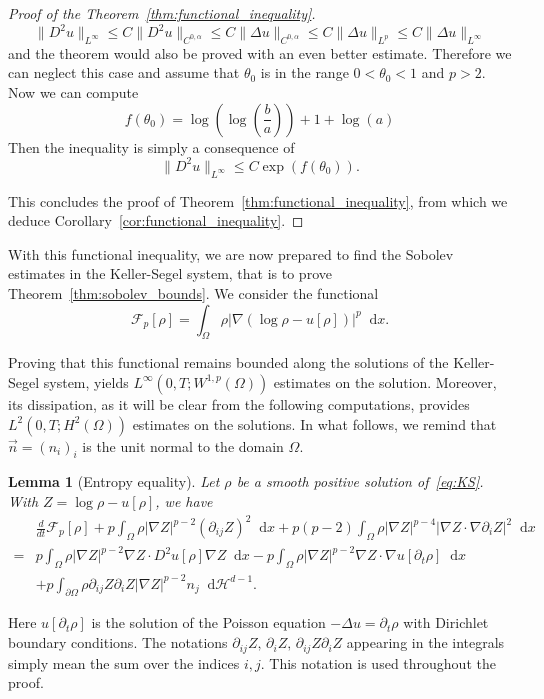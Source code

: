 \documentclass[a4paper,twosided, 11pt]{article}
\renewcommand{\color}[2][]{}
\newcommand {\f}   {\frac}
\newcommand {\p}   {\partial}
\theoremstyle{plain}
\newtheorem{lemma}[thm]{Lemma}
\theoremstyle{remark}
\newcommand{\diff}{\mathop{}\!\mathrm{d}}
\numberwithin{equation}{section}
\begin{document}
\begin{proof}[Proof of the Theorem~\ref{thm:functional_inequality}]
$$
\|D^{2} u\|_{L^{\infty}}\le C\|D^{2} u\|_{C^{0,\alpha}} \le C \|\Delta u\|_{C^{0,\alpha}}\le C \|\Delta u\|_{L^{p}} \le C \|\Delta u\|_{L^{\infty}}
$$
and the theorem would also be proved with an even better estimate. Therefore we can neglect this case and assume that $\theta_{0}$ is in the range $0<\theta_{0}<1$ and $p> 2$. 
Now we can compute
$$
f(\theta_{0}) = \log\left(\log\left(\f{b}{a}\right)\right)+1 + \log(a)
$$
Then the inequality is simply a consequence of 
$$
\|D^{2}u\|_{L^{\infty}}\le C\exp(f(\theta_{0})).
$$

This concludes the proof of Theorem~\ref{thm:functional_inequality}, from which we deduce Corollary~\ref{cor:functional_inequality}.
\end{proof}


With this functional inequality, we are now prepared to find the Sobolev estimates in the Keller-Segel system, that is to prove Theorem~\ref{thm:sobolev_bounds}. We consider the functional
$$
\mathcal{F}_{p}[\rho]= \int_{\Omega}\rho \left|\nabla (\log \rho - u[\rho])\right|^p\diff x.
$$

Proving that this functional remains bounded along the solutions of the Keller-Segel system, yields $L^{\infty}(0,T; W^{1,p}(\Omega))$ estimates on the solution. Moreover, its dissipation, as it will be clear from the following computations, provides $L^{2}(0,T; H^{2}(\Omega))$ estimates on the solutions. In what follows, we remind that $\vec{n} = (n_{i})_{i}$ is the unit normal to the domain $\Omega$.  

\begin{lemma}[Entropy equality]
Let $\rho$ {\color{blue}be a smooth positive solution} of~\eqref{eq:KS}. With  $Z=\log\rho -u[\rho]$, we have
\begin{equation}
\begin{split}
&\f{d}{dt}\mathcal{F}_{p}[\rho] + p\int_{\Omega} \rho|\nabla Z|^{p-2}(\p_{ij}Z)^2 \diff x + p(p-2)\int_{\Omega} \rho|\nabla Z|^{p-4} |\nabla Z\cdot\nabla\p_i Z|^2\diff x\\=&p\int_{\Omega} \rho |\nabla Z|^{p-2}\nabla Z\cdot D^2 u[\rho]\nabla Z \diff x- p\int_{\Omega} \rho |\nabla Z|^{p-2} \nabla Z\cdot \nabla u[\p_{t}\rho]\diff x\\
&+ p\int_{\p\Omega}\rho \p_{ij}Z \p_{i}Z |\nabla Z|^{p-2} n_{j}\diff \mathcal{H}^{d-1}.
\end{split}
\end{equation} 
\end{lemma}

Here $u[\p_{t}\rho]$ is the solution of the Poisson equation $-\Delta u = \p_t\rho$ with Dirichlet boundary conditions. The notations $\p_{ij}Z,\,  \p_{i}Z, \, \p_{ij}Z\p_{i}Z$ appearing in the integrals simply mean the sum over the indices $i,j$. This notation is used throughout the proof. 
\end{document}
